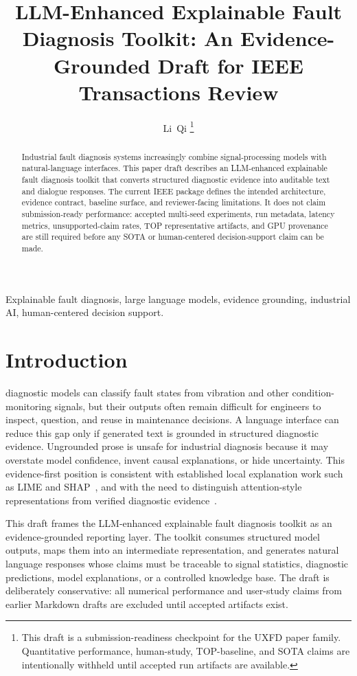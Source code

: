 \documentclass[journal]{IEEEtran}
\title{LLM-Enhanced Explainable Fault Diagnosis Toolkit: An Evidence-Grounded Draft for IEEE Transactions Review}
\author{Li~Qi%
\thanks{This draft is a submission-readiness checkpoint for the UXFD paper family. Quantitative performance, human-study, TOP-baseline, and SOTA claims are intentionally withheld until accepted run artifacts are available.}}
\begin{document}
\maketitle

\begin{abstract}
Industrial fault diagnosis systems increasingly combine signal-processing models
with natural-language interfaces. This paper draft describes an
LLM-enhanced explainable fault diagnosis toolkit that converts structured
diagnostic evidence into auditable text and dialogue responses. The current
IEEE package defines the intended architecture, evidence contract, baseline
surface, and reviewer-facing limitations. It does not claim submission-ready
performance: accepted multi-seed experiments, run metadata, latency metrics,
unsupported-claim rates, TOP representative artifacts, and GPU provenance are
still required before any SOTA or human-centered decision-support claim can be
made.
\end{abstract}

\begin{IEEEkeywords}
Explainable fault diagnosis, large language models, evidence grounding,
industrial AI, human-centered decision support.
\end{IEEEkeywords}

\section{Introduction}
 diagnostic models can classify fault states from
vibration and other condition-monitoring signals, but their outputs often remain
difficult for engineers to inspect, question, and reuse in maintenance
decisions. A language interface can reduce this gap only if generated text is
grounded in structured diagnostic evidence. Ungrounded prose is unsafe for
industrial diagnosis because it may overstate model confidence, invent causal
explanations, or hide uncertainty.
This evidence-first position is consistent with established local explanation
work such as LIME and SHAP~\cite{ribeiro2016why,lundberg2017unified}, and with
the need to distinguish attention-style representations from verified
diagnostic evidence~\cite{vaswani2017attention}.

This draft frames the LLM-enhanced explainable fault diagnosis toolkit as an
evidence-grounded reporting layer. The toolkit consumes structured model
outputs, maps them into an intermediate representation, and generates natural
language responses whose claims must be traceable to signal statistics,
diagnostic predictions, model explanations, or a controlled knowledge base. The
draft is deliberately conservative: all numerical performance and user-study
claims from earlier Markdown drafts are excluded until accepted artifacts exist.
\end{document}
